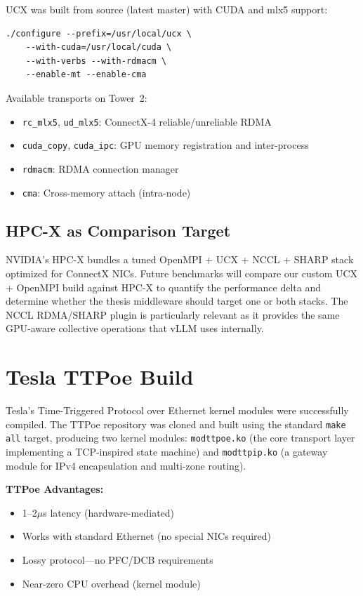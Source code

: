 \documentclass[10pt,letterpaper]{article}
\begin{document}
UCX was built from source (latest master) with CUDA and mlx5 support:

\begin{verbatim}
./configure --prefix=/usr/local/ucx \
    --with-cuda=/usr/local/cuda \
    --with-verbs --with-rdmacm \
    --enable-mt --enable-cma
\end{verbatim}

Available transports on Tower~2:
\begin{itemize}[noitemsep]
    \item \texttt{rc\_mlx5}, \texttt{ud\_mlx5}: ConnectX-4 reliable/unreliable RDMA
    \item \texttt{cuda\_copy}, \texttt{cuda\_ipc}: GPU memory registration and inter-process
    \item \texttt{rdmacm}: RDMA connection manager
    \item \texttt{cma}: Cross-memory attach (intra-node)
\end{itemize}

\subsection{HPC-X as Comparison Target}

NVIDIA's HPC-X \cite{hpcx-docs} bundles a tuned OpenMPI + UCX + NCCL + SHARP stack optimized for ConnectX NICs. Future benchmarks will compare our custom UCX + OpenMPI build against HPC-X to quantify the performance delta and determine whether the thesis middleware should target one or both stacks. The NCCL RDMA/SHARP plugin \cite{nccl-sharp} is particularly relevant as it provides the same GPU-aware collective operations that vLLM uses internally.

\section{Tesla TTPoe Build}

Tesla's Time-Triggered Protocol over Ethernet kernel modules \cite{ttpoe-repo,ttpoe-hotchips} were successfully compiled. The TTPoe repository was cloned and built using the standard \texttt{make all} target, producing two kernel modules: \texttt{modttpoe.ko} (the core transport layer implementing a TCP-inspired state machine) and \texttt{modttpip.ko} (a gateway module for IPv4 encapsulation and multi-zone routing).

\textbf{TTPoe Advantages:}
\begin{itemize}[noitemsep]
    \item 1--2$\mu$s latency (hardware-mediated)
    \item Works with standard Ethernet (no special NICs required)
    \item Lossy protocol---no PFC/DCB requirements
    \item Near-zero CPU overhead (kernel module)
\end{itemize}
\end{document}
